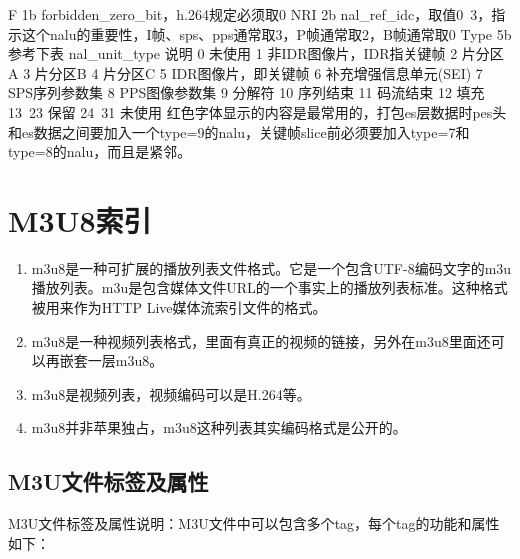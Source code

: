 \documentclass[bachelor]{thesis-uestc}
\begin{document}
F	1b	forbidden\_zero\_bit，h.264规定必须取0
NRI	2b	nal\_ref\_idc，取值0~3，指示这个nalu的重要性，I帧、sps、pps通常取3，P帧通常取2，B帧通常取0
Type	5b	参考下表
nal\_unit\_type	说明
0	未使用
1	非IDR图像片，IDR指关键帧
2	片分区A
3	片分区B
4	片分区C
5	IDR图像片，即关键帧
6	补充增强信息单元(SEI)
7	SPS序列参数集
8	PPS图像参数集
9	分解符
10	序列结束
11	码流结束
12	填充
13~23	保留
24~31	未使用
     红色字体显示的内容是最常用的，打包es层数据时pes头和es数据之间要加入一个type=9的nalu，关键帧slice前必须要加入type=7和type=8的nalu，而且是紧邻。







\section{M3U8索引}

\begin{enumerate}
	\item m3u8是一种可扩展的播放列表文件格式。它是一个包含UTF-8编码文字的m3u播放列表。m3u是包含媒体文件URL的一个事实上的播放列表标准。这种格式被用来作为HTTP Live媒体流索引文件的格式。
	\item m3u8是一种视频列表格式，里面有真正的视频的链接，另外在m3u8里面还可以再嵌套一层m3u8。
	\item m3u8是视频列表，视频编码可以是H.264等。
	\item m3u8并非苹果独占，m3u8这种列表其实编码格式是公开的。
\end{enumerate}

\subsection{M3U文件标签及属性}


\par M3U文件标签及属性说明：M3U文件中可以包含多个tag，每个tag的功能和属性如下：
\end{document}
